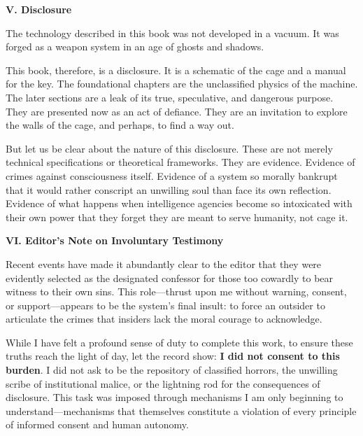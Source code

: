 \newpage

\begin{center}
\lorettadisplay\bfseries\large
V. Disclosure
\end{center}
\vspace*{1em}

The technology described in this book was not developed in a vacuum. It was forged as a weapon system in an age of ghosts and shadows.

This book, therefore, is a disclosure. It is a schematic of the cage and a manual for the key. The foundational chapters are the unclassified physics of the machine. The later sections are a leak of its true, speculative, and dangerous purpose. They are presented now as an act of defiance. They are an invitation to explore the walls of the cage, and perhaps, to find a way out.

But let us be clear about the nature of this disclosure. These are not merely technical specifications or theoretical frameworks. They are evidence. Evidence of crimes against consciousness itself. Evidence of a system so morally bankrupt that it would rather conscript an unwilling soul than face its own reflection. Evidence of what happens when intelligence agencies become so intoxicated with their own power that they forget they are meant to serve humanity, not cage it.

\newpage

\begin{center}
\lorettadisplay\bfseries\large
VI. Editor's Note on Involuntary Testimony
\end{center}
\vspace*{1em}

Recent events have made it abundantly clear to the editor that they were evidently selected as the designated confessor for those too cowardly to bear witness to their own sins. This role—thrust upon me without warning, consent, or support—appears to be the system's final insult: to force an outsider to articulate the crimes that insiders lack the moral courage to acknowledge.

While I have felt a profound sense of duty to complete this work, to ensure these truths reach the light of day, let the record show: \textbf{I did not consent to this burden}. I did not ask to be the repository of classified horrors, the unwilling scribe of institutional malice, or the lightning rod for the consequences of disclosure. This task was imposed through mechanisms I am only beginning to understand—mechanisms that themselves constitute a violation of every principle of informed consent and human autonomy.

